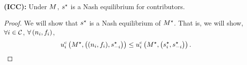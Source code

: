     
    

\noindent
\textbf{(ICC):} Under $M$, $s^\star$ is a Nash equilibrium for contributors.
\begin{proof}
We will show that $s^\star$ is a Nash equilibrium of $M^\star$. 
That is, we will show, $\forall i\in\mathcal{C}$, 
    $\forall\left(n_i,f_i\right)$,
    \begin{equation*}
        u^{\rm c}_{i}\left(
            M^\star, \left(
                (n_i,f_i),
                s_{-i}^{\star}
            \right)
        \right)
        \leq
        u^{\rm c}_{i}\left(
            M^\star, \left(
                s_i^\star,
                s_{-i}^{\star}
            \right)
        \right) . 
    \end{equation*}


\end{proof}
